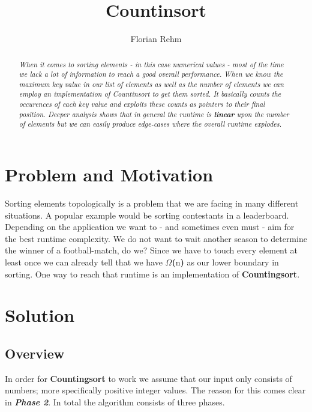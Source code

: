 \documentclass{article}
\newcommand{\lowerbound}[1]{
    \textbf{$\Omega$(}#1\textbf{)}
}
\begin{document}
    \title{\textbf{Countinsort}}
    \author{Florian Rehm}
    \maketitle
    \newpage
    \begin{abstract}
        \textit{
            When it comes to sorting elements - in this case numerical values - most of the time we
            lack a lot of information to reach a good overall performance. When we know the maximum key value in
            our list of elements as well as the number of elements we can employ an implementation of Countinsort
            to get them sorted. It basically counts the occurences of each key value and exploits these counts
            as pointers to their final position. Deeper analysis shows that in general the runtime is \textbf{linear}
            upon the number of elements but we can easily produce edge-cases where the overall runtime explodes.
        }
    \end{abstract}
    \newpage
    \tableofcontents
    \newpage
    \section{Problem and Motivation}
        Sorting elements topologically is a problem that we are facing in many different situations. A popular example would be sorting contestants in a leaderboard. Depending on the application we want to - and sometimes even must - aim for the best runtime complexity. We do not want to wait another season to determine the winner of a football-match, do we? Since we have to touch every element at least once we can already tell that we have \lowerbound{n} as our lower boundary in sorting. One way to reach that runtime is an implementation of \textbf{Countingsort}.
    \newpage
    \section{Solution}
        \subsection{Overview}
        In order for \textbf{Countingsort} to work we assume that our input only consists of numbers; more specifically
        positive integer values. The reason for this comes clear in \textit{\textbf{Phase 2}}. In total the algorithm
        consists of three phases.
        
\end{document}
